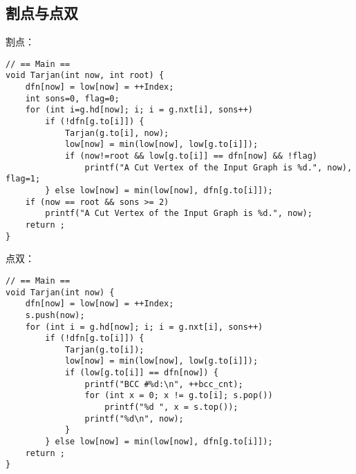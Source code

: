 \subsection{割点与点双}

割点：

\begin{verbatim}
// == Main ==
void Tarjan(int now, int root) {
    dfn[now] = low[now] = ++Index;
    int sons=0, flag=0;
    for (int i=g.hd[now]; i; i = g.nxt[i], sons++)
        if (!dfn[g.to[i]]) {
            Tarjan(g.to[i], now);
            low[now] = min(low[now], low[g.to[i]]);
            if (now!=root && low[g.to[i]] == dfn[now] && !flag)
                printf("A Cut Vertex of the Input Graph is %d.", now), flag=1;
        } else low[now] = min(low[now], dfn[g.to[i]]);
    if (now == root && sons >= 2)
        printf("A Cut Vertex of the Input Graph is %d.", now);
    return ;
}
\end{verbatim}

点双：

\begin{verbatim}
// == Main ==
void Tarjan(int now) {
    dfn[now] = low[now] = ++Index;
    s.push(now);
    for (int i = g.hd[now]; i; i = g.nxt[i], sons++)
        if (!dfn[g.to[i]]) {
            Tarjan(g.to[i]);
            low[now] = min(low[now], low[g.to[i]]);
            if (low[g.to[i]] == dfn[now]) {
                printf("BCC #%d:\n", ++bcc_cnt);
                for (int x = 0; x != g.to[i]; s.pop())
                    printf("%d ", x = s.top());
                printf("%d\n", now);
            }
        } else low[now] = min(low[now], dfn[g.to[i]]);
    return ;
}
\end{verbatim}